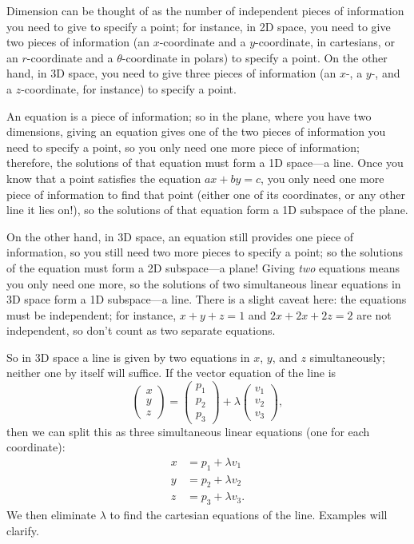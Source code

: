 \documentclass{article}
\begin{document}
Dimension can be thought of as the number of independent pieces of information you need to give to specify a point; for instance, in 2D space, you need to give two pieces of information (an $x$-coordinate and a $y$-coordinate, in cartesians, or an $r$-coordinate and a $\theta$-coordinate in polars) to specify a point. On the other hand, in 3D space, you need to give three pieces of information (an $x$-, a $y$-, and a $z$-coordinate, for instance) to specify a point.

An equation is a piece of information; so in the plane, where you have two dimensions, giving an equation gives one of the two pieces of information you need to specify a point, so you only need one more piece of information; therefore, the solutions of that equation must form a 1D space---a line. Once you know that a point satisfies the equation $ax+by=c$, you only need one more piece of information to find that point (either one of its coordinates, or any other line it lies on!), so the solutions of that equation form a 1D subspace of the plane.

On the other hand, in 3D space, an equation still provides one piece of information, so you still need two more pieces to specify a point; so the solutions of the equation must form a 2D subspace---a plane! Giving \textit{two} equations means you only need one more, so the solutions of two simultaneous linear equations in 3D space form a 1D subspace---a line. There is a slight caveat here: the equations must be independent; for instance, $x+y+z=1$ and $2x+2x+2z=2$ are not independent, so don't count as two separate equations.\bigskip


So in 3D space a line is given by two equations in $x$, $y$, and $z$ simultaneously; neither one by itself will suffice. If the vector equation of the line is
\[\left(\begin{array}{c}x\\y\\z\end{array}\right)=\left(\begin{array}{c}p_1\\p_2\\p_3\end{array}\right)+\lambda\left(\begin{array}{c}v_1\\v_2\\v_3\end{array}\right),\]
then we can split this as three simultaneous linear equations (one for each coordinate):
\begin{align*}
	x&=p_1+\lambda v_1\\
	y&=p_2+\lambda v_2\\
	z&=p_3+\lambda v_3.
\end{align*}
We then eliminate $\lambda$ to find the cartesian equations of the line. Examples will clarify.
\end{document}
